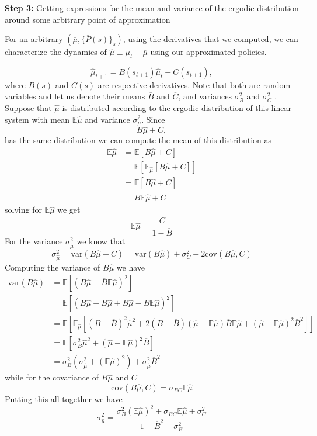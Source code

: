 \documentclass[thmsb,11pt]{article}
\newcommand{\EE}{\mathbb E}
\newcommand{\var}{\mathrm{var}}
\newcommand{\cov}{\mathrm{cov}}
\newcommand{\barB}{{\overline B}}
\newcommand{\barC}{{\overline C}}
\newcommand{\mubar}{{\overline \mu}}
\begin{document}
\textbf{Step 3:} Getting expressions for the mean and variance of the ergodic distribution around some arbitrary point of approximation

For an arbitrary $\left (\overline \mu,\{\overline {P}(s )\}_{s}\right)$, using the derivatives that we computed, we can characterize the dynamics of $\hat{\mu}\equiv\mu_t-\mubar$ using our approximated policies.


\[
	\hat \mu_{t+1} = B(s_{t+1}) \hat\mu_t + C(s_{t+1}),
\]  where $B(s)$ and $C(s)$ are respective derivatives. Note that both are random variables and let us denote their means $\barB$ and $\barC$, and variances $\sigma_B^2$ and $\sigma_C^2$ .  Suppose that $\hat\mu$ is distributed according to the ergodic distribution of this linear system with mean $\EE\hat\mu$ and variance $\sigma^2_\mu$.  Since
\[
	B\hat\mu +C,
\]has the same distribution we can compute the mean of this distribution as
\[
\begin{split}
	\EE\hat\mu &= \EE\left[ B\hat\mu+C\right]\\
			  &= \EE\left[\EE_{\hat\mu}\left[B\hat\mu+C\right]\right]\\
			  &= \EE\left[\barB\hat\mu +\barC\right]\\
			  &=\barB\EE\hat\mu+\barC
\end{split}
\]solving for $\EE\hat\mu$ we get
\begin{equation}
	\EE\hat\mu = \frac{\barC}{1-\barB}
\end{equation}For the variance $\sigma^2_{\hat\mu}$ we know that
\[
	\sigma^2_{\hat\mu} = \var(B\hat\mu+C) = \var(B\hat\mu) + \sigma_C^2 + 2\cov(B\hat\mu,C)
\]Computing the variance of $B\hat \mu$ we have
\[
\begin{split}
	\var(B\hat\mu) &=\EE\left[(B\hat\mu - \barB\EE\hat\mu)^2\right]\\
			       &=\EE\left[(B\hat\mu-\barB\hat\mu +\barB\hat\mu -\barB\EE\hat\mu)^2\right]\\
			      &=\EE\left[\EE_{\hat\mu}\left[(B-\barB)^2\hat\mu^2 +2(B-\barB)(\hat\mu-\EE\hat\mu)\barB\EE\hat\mu + (\hat\mu-\EE\hat\mu)^2\bar B^2\right]\right]\\
			&=\EE\left[\sigma_B^2\hat\mu^2 +(\hat\mu-\EE\hat\mu)^2\barB\right]\\
			& = \sigma_B^2(\sigma_{\hat\mu}^2+(\EE\hat\mu)^2) + \sigma_{\hat\mu}^2\barB^2
\end{split}
\]while for the covariance of $B\hat\mu$ and $C$
\[
	\cov(B\hat\mu,C) = \sigma_{BC}\EE\hat\mu
\]Putting this all together we have
\begin{equation}
	\sigma_{\hat\mu}^2 = \frac{\sigma_B^2(\EE\hat\mu)^2 + \sigma_{BC}\EE\hat\mu + \sigma_C^2}{1-\barB^2-\sigma_B^2}
\end{equation}
\end{document}
